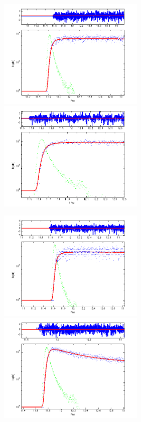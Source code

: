 \begin{figure}[htbp]
\begin{center}
\includegraphics[width=7cm]{../Pictures/Chapter_7/CTI.png}
\includegraphics[width=7cm]{../Pictures/Chapter_7/ca_ce.png}
\end{center}
\caption[]{}
\label{fig:cti_cace}
\end{figure}

\begin{figure}[htbp]
\begin{center}
\includegraphics[width=7cm]{../Pictures/Chapter_7/lgso.png}
\includegraphics[width=7cm]{../Pictures/Chapter_7/cef3.png}
\end{center}
\caption[]{}
\label{fig:lgso_cef3}
\end{figure}

